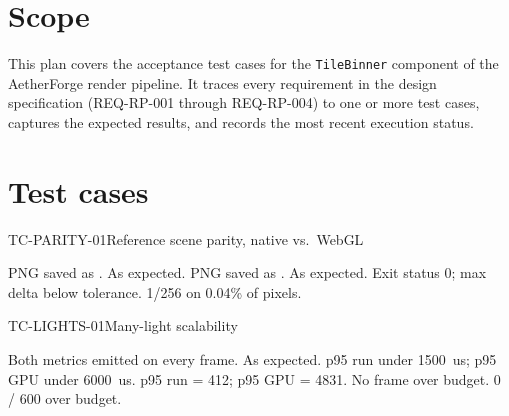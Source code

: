 \documentclass[11pt]{article}
\begin{document}
\makedoctocpage

\section{Scope}
This plan covers the acceptance test cases for the \texttt{TileBinner}
component of the AetherForge render pipeline. It traces every
requirement in the design specification (REQ-RP-001 through
REQ-RP-004) to one or more test cases, captures the expected results,
and records the most recent execution status.

\section{Test cases}

\begin{testcase}{TC-PARITY-01}{Reference scene parity, native vs.\ WebGL}
  \begin{teststeps}
          {PNG saved as .}%
          {As expected.}{\Pass}
          {PNG saved as .}%
          {As expected.}{\Pass}
          {Exit status 0; max delta below tolerance.}%
          {1/256 on 0.04\% of pixels.}{\Pass}
  \end{teststeps}
\end{testcase}

\begin{testcase}{TC-LIGHTS-01}{Many-light scalability}
  \begin{teststeps}
          {Both metrics emitted on every frame.}%
          {As expected.}{\Pass}
          {p95 run under 1500~us; p95 GPU under 6000~us.}%
          {p95 run = 412; p95 GPU = 4831.}{\Pass}
          {No frame over budget.}%
          {0 / 600 over budget.}{\Pass}
  \end{teststeps}
\end{testcase}
\end{document}

